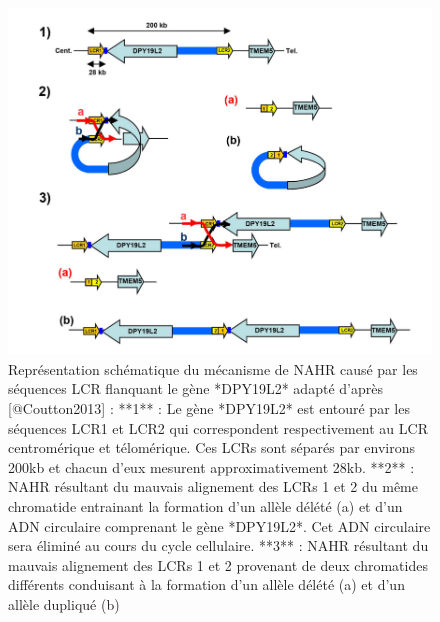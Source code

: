 \documentclass[12pt,twoside]{reedthesis}
\theoremstyle{definition}
\theoremstyle{definition}
\theoremstyle{remark}
\begin{document}
  \begin{figure}
  
  {\centering \includegraphics[scale=0.5]{figure/dpy_nahr} 
  
  }
  
  \caption[Représentation schématique du mécanisme de NAHR causé par les séquences LCR flanquant le gène *DPY19L2*]{Représentation schématique du mécanisme de NAHR causé par les séquences LCR flanquant le gène *DPY19L2* adapté d'après [@Coutton2013] : **1** : Le gène *DPY19L2* est entouré par les séquences LCR1 et LCR2 qui correspondent respectivement au LCR centromérique et télomérique. Ces LCRs sont séparés par environs 200kb et chacun d'eux mesurent approximativement 28kb. **2** : NAHR résultant du mauvais alignement des LCRs 1 et 2 du même chromatide entrainant la formation d'un allèle délété (a) et d'un ADN circulaire comprenant le gène *DPY19L2*. Cet ADN circulaire sera éliminé au cours du cycle cellulaire. **3** : NAHR résultant du mauvais alignement des LCRs 1 et 2 provenant de deux chromatides différents conduisant à la formation d'un allèle délété (a) et d'un allèle dupliqué (b)}\label{fig:nahr}
  \end{figure}
  
\end{document}
